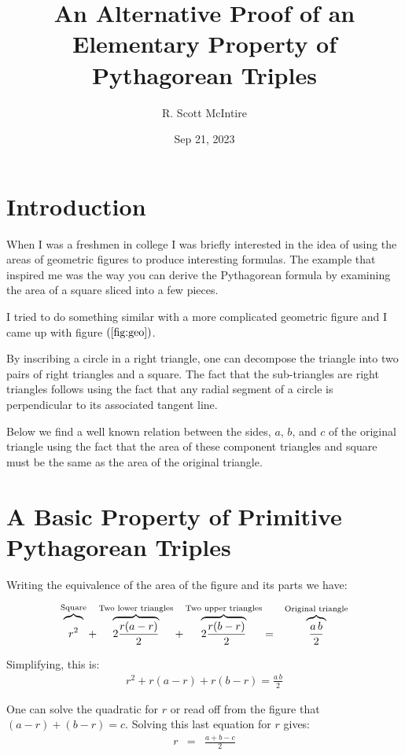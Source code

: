 \documentclass[12pt]{article}
\title{An Alternative Proof of an Elementary Property of Pythagorean Triples}
\author{R. Scott McIntire}
\date{Sep 21, 2023}
\begin{document}
\maketitle

\section{Introduction}
When I was a freshmen in college I was briefly interested in the idea of 
using the areas of geometric figures to
produce interesting formulas. The example that inspired me was the way you 
can derive the Pythagorean formula
by examining the area of a square sliced into a few pieces.

I tried to do something similar with a more complicated geometric figure and 
I came up with figure $(\ref{fig:geo})$.

By inscribing a circle in a right triangle, one can decompose the triangle 
into two pairs of right triangles and a square. The fact that the sub-triangles
are right triangles follows using the fact that 
any radial segment of a circle is perpendicular to its
associated tangent line.

Below we find a well known relation between the sides, $a$, $b$, and $c$ of the
original triangle using the fact that the area of these component triangles 
and square must be the same as the area of the original triangle. 

\section{A Basic Property of Primitive Pythagorean Triples}
Writing the equivalence of the area of the figure and its parts we have:

\begin{eqnarray}
    \overbrace{\vphantom{\frac{X^1}{X}}r^2}^{\text{Square}} 
    + \overbrace{2 \frac{r(a - r)}{2}}^{\text{Two lower triangles}} 
    + \overbrace{2 \frac{r(b-r)}{2}}^{\text{Two upper triangles}}  
    &=& \overbrace{\frac{a\, b}{2}}^{\text{Original triangle}}  
\end{eqnarray}

Simplifying, this is:
\begin{eqnarray}
r^2 + r(a - r) + r(b-r) = \frac{a\, b}{2} \label{area} 
\end{eqnarray}

One can solve the quadratic for $r$ or read off from the figure 
that $(a-r) + (b-r) = c$. Solving this last equation for $r$ gives:
\begin{eqnarray}
  r & = & \frac{a + b - c}{2} \label{radius}
\end{eqnarray}
\end{document}
